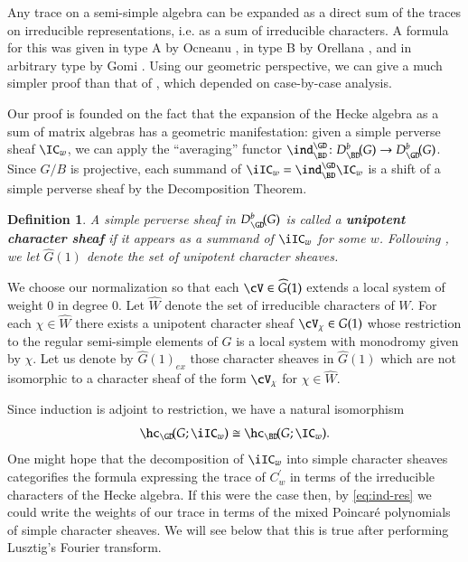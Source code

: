 \documentclass[12pt]{amsart}
\def\to{\rightarrow}
\newtheorem{defi}[thm]{Definition}
\theoremstyle{remark}
\begin{document}
Any trace on a semi-simple algebra can be
expanded as a direct sum of the traces on irreducible representations,
i.e. as a sum of irreducible characters.  A formula for this was given
in type A by Ocneanu \cite{Wenzl}, in type B by Orellana
\cite{Orellana}, and in arbitrary type by Gomi \cite{Gomi}.  Using
our geometric perspective, we can give a much simpler proof than that
of \cite{Gomi}, which depended on case-by-case analysis.


Our proof is founded on the fact that the expansion of the Hecke
algebra as a sum of matrix algebras has a geometric manifestation:
given a simple perverse sheaf $\IC_w$, we can apply the ``averaging''
functor $\ind^{\GD}_{\BD}\colon D^b_{\BD}\!(G)\to D^b_{\GD}\!(G)$.
Since $G/B$ is projective, each summand
of $\iIC_w=\ind^{\GD}_{\BD}\IC_w$ is a shift of a simple perverse
sheaf by the Decomposition Theorem.
\begin{defi}
  A simple perverse sheaf in $D^b_{\GD}\!(G)$ is called a {\bf
    unipotent character sheaf} if it appears as a summand of $\iIC_w$
  for some $w$.  Following \cite[\S 5.2]{MSp}, we let $\widehat G(1)$
  denote the set of unipotent character sheaves.
\end{defi}

We choose our normalization so that each $\cV \in \widehat G(1)$
extends a local system of weight 0 in degree 0. Let $\widehat W$ denote the set of irreducible characters of $W$. For each
$\chi \in \widehat W$ there exists a unipotent character sheaf
$\cV_{\chi} \in G(1)$ whose restriction to the regular semi-simple
elements of $G$ is a local system with monodromy given by
$\chi$. Let us denote by $\widehat{ G}(1)_{ex}$ those
character sheaves in $\widehat G(1)$ which are not isomorphic to a character sheaf of the form
$\cV_{\chi}$ for $\chi \in \widehat W$.

Since induction is adjoint to restriction, we have a natural isomorphism
\begin{equation} \label{eq:ind-res}
  \hc_{\GD}\!(G;\iIC_w)\cong \hc_{\BD}\!(G;\IC_w).
\end{equation}
One might hope that the decomposition of $\iIC_w$ into simple character sheaves categorifies the formula expressing the trace of $C^{\prime}_w$ in terms of  the irreducible characters of the Hecke algebra. If this were the case then, by \eqref{eq:ind-res} we could write the weights of our trace in terms of the mixed Poincar\'e polynomials of simple character sheaves. We will see below that this is true after performing Lusztig's Fourier transform.
\end{document}
